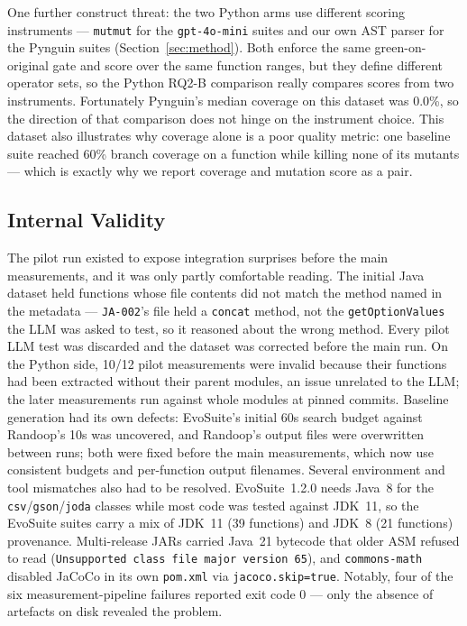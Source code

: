 One further construct threat: the two Python arms use different scoring instruments ---
\texttt{mutmut} for the \texttt{gpt-4o-mini} suites and our own AST parser for the Pynguin
suites (Section~\ref{sec:method}). Both enforce the same green-on-original gate and score
over the same function ranges, but they define different operator sets, so the Python
RQ2-B comparison really compares scores from two instruments. Fortunately Pynguin's median
coverage on this dataset was 0.0\%, so the direction of that comparison does not hinge on
the instrument choice. This dataset also illustrates why coverage alone is a poor quality
metric: one baseline suite reached 60\% branch coverage on a function while killing none of
its mutants --- which is exactly why we report coverage and mutation score as a pair.

\subsection{Internal Validity}
The pilot run existed to expose integration surprises before the main measurements, and it
was only partly comfortable reading. The initial Java dataset held functions whose file
contents did not match the method named in the metadata --- \texttt{JA-002}'s file held a
\texttt{concat} method, not the \texttt{getOptionValues} the LLM was asked to test, so it
reasoned about the wrong method. Every pilot LLM test was discarded and the dataset was
corrected before the main run. On the Python side, 10/12 pilot measurements were invalid
because their functions had been extracted without their parent modules, an issue
unrelated to the LLM; the later measurements run against whole modules at pinned commits.
Baseline generation had its own defects: EvoSuite's initial 60s search budget against
Randoop's 10s was uncovered, and Randoop's output files were overwritten between runs; both
were fixed before the main measurements, which now use consistent budgets and per-function
output filenames. Several environment and tool mismatches also had to be resolved.
EvoSuite~1.2.0 needs Java~8 for the \texttt{csv}/\texttt{gson}/\texttt{joda} classes while
most code was tested against JDK~11, so the EvoSuite suites carry a mix of JDK~11
(39 functions) and JDK~8 (21 functions) provenance. Multi-release JARs carried Java~21
bytecode that older ASM refused to read (\texttt{Unsupported class file major version 65}),
and \texttt{commons-math} disabled JaCoCo in its own \texttt{pom.xml} via
\texttt{jacoco.skip=true}. Notably, four of the six measurement-pipeline failures reported
exit code 0 --- only the absence of artefacts on disk revealed the problem.

